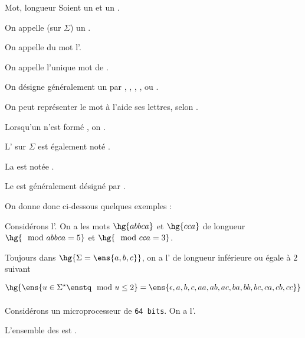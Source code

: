    \begin{definition}{Mot, longueur}{}
        Soient \hg{$\Sigma$} un  et  un .
        \begin{enumerate}
            \itast On appelle  (sur $\Sigma$) un .
            
            \itast On appelle  du mot  l'.
            
            \itast On appelle  l'unique mot  de .
        \end{enumerate}
    \end{definition}
    \begin{notation}
        \begin{enumerate}
            \itt On désigne généralement un  par , , , ,  ou .
            
            \itt On peut représenter le mot  à l'aide ses lettres, selon 
            . 
            
            \itt Lorsqu'un  n'est formé , on .
            
            \itt L' sur $\Sigma$ est également noté \hg{$\Sigma^\star$}.
            
            \itt La  est notée .
            
            \itt Le  est généralement désigné par \hg{$\epsilon$}.
        \end{enumerate}
    \end{notation}
    
    On donne donc ci-dessous quelques exemples :
    
    \begin{example}{}{}
        \begin{enumerate}
            \itt Considérons l'. On a les mots $\hg{abbca}$ et $\hg{cca}$ de longueur 
            $\hg{\mod{abbca} = 5}$ et $\hg{\mod{cca} = 3}$.
            
            \itt Toujours dans $\hg{\Sigma = \ens{a, b, c}}$, on a l' de longueur inférieure ou égale à $2$ suivant
            \[ \hg{\ens{u \in \Sigma^\star \vphantom{\dfrac{-}{-}}\enstq \mod{u} \leq 2} = \ens{\epsilon, a, b, c, aa, ab, ac, ba, bb, bc, ca, cb,
            cc}} \]
            
            \itt Considérons un microprocesseur de \texttt{64 bits}. On a l'.
            
            L'ensemble des  est . 
        \end{enumerate}
    \end{example}
    
